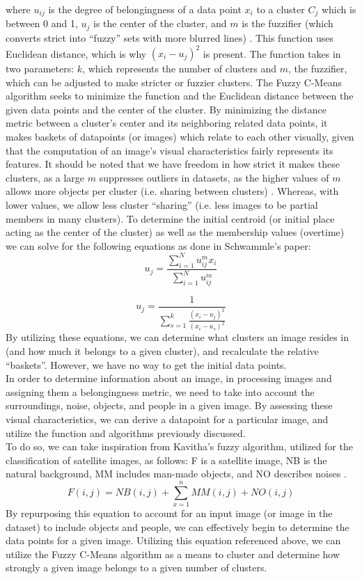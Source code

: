 \documentclass[10pt,twocolumn]{article}
\begin{document}
where \(u_{ij}\) is the degree of belongingness of a data point \(x_i \) to a cluster \(C_j \) which is between 0 and 1, \(u_j \) is the center of the cluster, and \(m \) is the fuzzifier (which converts strict into “fuzzy” sets with more blurred lines) \cite{PrasadClustering}. This function uses Euclidean distance, which is why \((x_i - u_j)^2 \) is present. The function takes in two parameters: \(k\), which represents the number of clusters and \(m \), the fuzzifier, which can be adjusted to make stricter or fuzzier clusters. The Fuzzy C-Means algorithm seeks to minimize the function and the Euclidean distance between the given data points and the center of the cluster. By minimizing the distance metric between a cluster’s center and its neighboring related data points, it makes baskets of datapoints (or images) which relate to each other visually, given that the computation of an image's visual characteristics fairly represents its features. It should be noted that we have freedom in how strict it makes these clusters, as a large \(m \) suppresses outliers in datasets, as the higher values of \(m \) allows more objects per cluster (i.e. sharing between clusters) \cite{Schwammle2010}. Whereas, with lower values, we allow less cluster “sharing” (i.e. less images to be partial members in many clusters). To determine the initial centroid (or initial place acting as the center of the cluster) as well as the membership values (overtime) we can solve for the following equations as done in Schwammle’s paper: 
\[u_j = \frac{\sum_{i=1}^Nu_{ij}^m x_i}{\sum_{i=1}^Nu_{ij}^m}\] 

\[u_j = \frac{1}{\sum_{s=1}^k \frac{(x_i - u_j)^2}{(x_i - u_s)^2} }\] 
By utilizing these equations, we can determine what clusters an image resides in (and how much it belongs to a given cluster), and recalculate the relative “baskets”. However, we have no way to get the initial data points. \\
\indent In order to determine information about an image, in processing images and assigning them a belongingness metric, we need to take into account the surroundings, noise, objects, and people in a given image. By assessing these visual characteristics, we can derive a datapoint for a particular image, and utilize the function and algorithms previously discussed. \\
\indent To do so, we can take inspiration from Kavitha’s fuzzy algorithm, utilized for the classification of satellite images, as follows: F is a satellite image, NB is the natural background, MM includes man-made objects, and NO describes noises \cite{Kavitha2020}.
\[F(i, j) = NB(i,j) + \sum_{x=1}^{n} MM(i, j) + NO(i, j) \]
\indent By repurposing this equation to account for an input image (or image in the dataset) to include objects and people, we can effectively begin to determine the data points for a given image. Utilizing this equation referenced above, we can utilize the Fuzzy C-Means algorithm as a means to cluster and determine how strongly a given image belongs to a given number of clusters.
\end{document}
